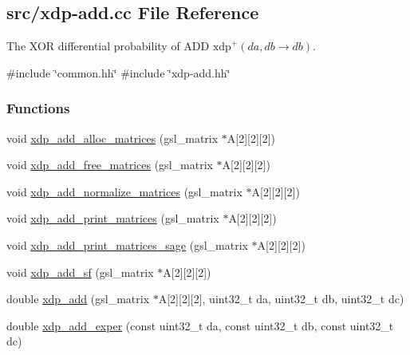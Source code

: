 \hypertarget{xdp-add_8cc}{\subsection{src/xdp-\/add.cc \-File \-Reference}
\label{xdp-add_8cc}
}


\-The \-X\-O\-R differential probability of \-A\-D\-D $\mathrm{xdp}^{+}(da,db \rightarrow db)$.  


{\ttfamily \#include \char`\"{}common.\-hh\char`\"{}}\*
{\ttfamily \#include \char`\"{}xdp-\/add.\-hh\char`\"{}}\*
\subsubsection*{\-Functions}
\begin{DoxyCompactItemize}
\item 
void \hyperlink{xdp-add_8cc_a247fd733ccecc4e8431c6dad9c98458c}{xdp\-\_\-add\-\_\-alloc\-\_\-matrices} (gsl\-\_\-matrix $\ast$\-A\mbox{[}2\mbox{]}\mbox{[}2\mbox{]}\mbox{[}2\mbox{]})
\item 
void \hyperlink{xdp-add_8cc_a8b65b48440a5685a32623be15a5a9fd2}{xdp\-\_\-add\-\_\-free\-\_\-matrices} (gsl\-\_\-matrix $\ast$\-A\mbox{[}2\mbox{]}\mbox{[}2\mbox{]}\mbox{[}2\mbox{]})
\item 
void \hyperlink{xdp-add_8cc_a9fe9a298ec6ec4d7c8ed744b98f4c0ac}{xdp\-\_\-add\-\_\-normalize\-\_\-matrices} (gsl\-\_\-matrix $\ast$\-A\mbox{[}2\mbox{]}\mbox{[}2\mbox{]}\mbox{[}2\mbox{]})
\item 
void \hyperlink{xdp-add_8cc_a43f71c6ad463c37499d44c7e881c3702}{xdp\-\_\-add\-\_\-print\-\_\-matrices} (gsl\-\_\-matrix $\ast$\-A\mbox{[}2\mbox{]}\mbox{[}2\mbox{]}\mbox{[}2\mbox{]})
\item 
void \hyperlink{xdp-add_8cc_a5b76b0ac0f3edb9bd47a80348d5791ab}{xdp\-\_\-add\-\_\-print\-\_\-matrices\-\_\-sage} (gsl\-\_\-matrix $\ast$\-A\mbox{[}2\mbox{]}\mbox{[}2\mbox{]}\mbox{[}2\mbox{]})
\item 
void \hyperlink{xdp-add_8cc_af484105ee4ba34f7f20d63b798ebe851}{xdp\-\_\-add\-\_\-sf} (gsl\-\_\-matrix $\ast$\-A\mbox{[}2\mbox{]}\mbox{[}2\mbox{]}\mbox{[}2\mbox{]})
\item 
double \hyperlink{xdp-add_8cc_a25473697bd215fe5eb997574be30e6f3}{xdp\-\_\-add} (gsl\-\_\-matrix $\ast$\-A\mbox{[}2\mbox{]}\mbox{[}2\mbox{]}\mbox{[}2\mbox{]}, uint32\-\_\-t da, uint32\-\_\-t db, uint32\-\_\-t dc)
\item 
double \hyperlink{xdp-add_8cc_a2d199034befe8d8455790eee9ab64a25}{xdp\-\_\-add\-\_\-exper} (const uint32\-\_\-t da, const uint32\-\_\-t db, const uint32\-\_\-t dc)

\end{DoxyCompactItemize}
